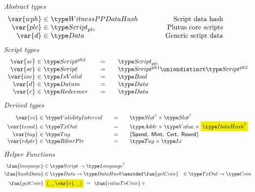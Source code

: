 \begin{figure*}[htb]
  \emph{Abstract types}
  \begin{equation*}
    \begin{array}{r@{~\in~}l@{\quad\quad\quad\quad}r}
      \var{wph} &\WitnessPPDataHash & \text{Script data hash}\\
      \var{plc} & \ScriptPlutus & \text{Plutus core scripts} \\
      \var{d} & \Data & \text{Generic script data}
    \end{array}
  \end{equation*}
  \emph{Script types}
  \begin{equation*}
    \begin{array}{r@{~\in~}l@{\qquad=\qquad}lr}
      \var{sc} & \ScriptPhTwo & \ScriptPlutus \\
      \var{sc} & \Script & \ScriptPhOne \uniondistinct \ScriptPhTwo \\
      \var{isv} & \IsValid & \Bool \\
      \var{d} & \Datum & \Data \\
      \var{r} & \Redeemer & \Data
    \end{array}
  \end{equation*}
%
  \emph{Derived types}
  \begin{equation*}
    \begin{array}{r@{~\in~}l@{\qquad=\qquad}lr}
      \var{vi}
      & \ValidityInterval
      & \Slot^? \times \Slot^?
      \\
      \var{txout}
      & \TxOut
      & \Addr \times \Value \times \hldiff{\DataHash^?}
      \\
      \var{tag}
      & \Tag
      & \{\mathsf{Spend},~\mathsf{Mint},~\mathsf{Cert},~\mathsf{Rewrd}\}
      \\
      \var{rdptr}
      & \RdmrPtr
      & \Tag \times \Ix
    \end{array}
  \end{equation*}
  \emph{Helper Functions}
  \begin{align*}
    \fun{language}& \in \Script \to \Language^?\\
    \fun{hashData}& \in \Data \to \DataHash
    \nextdef
    \fun{getCoin}& \in \TxOut \to \Coin \\
    \fun{getCoin}&~\hldiff{{(\_, \var{v}, \_)}} ~=~\fun{valueToCoin}~{v}
  \end{align*}

\end{figure*}
